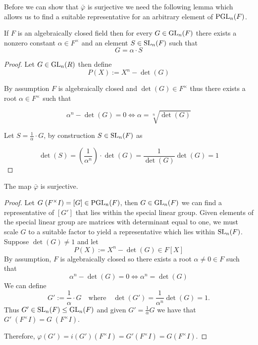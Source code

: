 Before we can show that $\bar{\varphi}$ is surjective we need the following
lemma which allows us to find a suitable representative for an arbitrary element of $\operatorname{PGL}_n(F)$.

\begin{lemma}
\label{exists_SL_eq_scaled_GL_of_IsAlgClosed}
\leanok
If $F$ is an algebraically closed field then for every $G \in \operatorname{GL}_n(F)$ there exists a nonzero constant $\alpha \in F^\times$ and an element $S \in \operatorname{SL}_n(F)$ such that 
\begin{equation*}
    G = \alpha \cdot S
\end{equation*}
\end{lemma}

\begin{proof}
\leanok
Let $G \in \operatorname{GL}_n(R)$ then define
\begin{equation*}
    P(X) := X^n - \det(G)
\end{equation*}

By assumption $F$ is algebraically closed and $\det(G) \in F^\times$ thus there exists a root $\alpha \in F^\times$ such that 

\begin{equation*}
    \alpha^n - \det(G) = 0 \iff \alpha = \sqrt[n]{\det(G)} 
\end{equation*}

Let $S = \frac{1}{\alpha} \cdot G$, by construction $S \in \operatorname{SL}_n(F)$ as 

\begin{equation*}
    \det(S) = \left(\frac{1}{\alpha^n}\right) \cdot \det(G) = \frac{1}{\det(G)} \det(G) = 1
\end{equation*}
\end{proof}


\begin{lemma}
\label{Surjective_PSL_monoidHom_PGL}
\leanok
    The map $\bar{\varphi}$ is surjective.
\end{lemma}
\begin{proof}
\leanok
    Let $G \; (F^\times I) = [G] \in \operatorname{PGL}_n(F)$, then $G \in \operatorname{GL}_n(F)$ we can find a representative of $[G']$ that lies within the special linear group.
    Given elements of the special linear group are matrices with determinant equal to one, we must scale $G$ to a suitable factor to yield a representative which lies within $\operatorname{SL}_n(F)$. Suppose $\det(G) \ne 1$ and let
    \[
    P(X) := X^n - \det(G) \in F[X]
    \]
    By assumption, $F$ is algebraically closed so there exists a root $\alpha \ne 0\in F$ such that 
    \[
    \alpha^n - \det(G) = 0 \iff \alpha^n = \det(G)
    \]
    We can define
    \[
    G' := \frac{1}{\alpha} \cdot G \quad \text{where} \quad \det(G') = \frac{1}{\alpha^n} \det(G) = 1.
    \]
    Thus $G' \in \operatorname{SL}_n(F) \leq \operatorname{GL}_n(F)$ and given $G' = \frac{1}{\alpha} G$ we have that $G'  \; (F^\times I) = G \; (F^\times I)$.
    
    Therefore, $\varphi(G') = i(G') (F^\times I) = G' (F^\times I) = G (F^\times I)$.
\end{proof}


